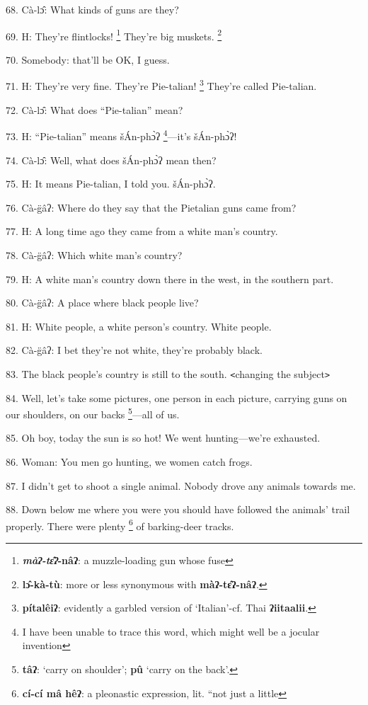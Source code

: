 {68. Cà-lɔ̂: What kinds of guns are they?

69. H: They're flintlocks! \footnote{\textbf{\emph{màʔ-tɛ̂ʔ}}\textbf{-nâʔ}: a muzzle-loading gun whose fuse} They're big muskets. \footnote{\textbf{lɔ̂-kà-tù}: more or less synonymous with \textbf{màʔ-tɛ̂ʔ-nâʔ}.}

70. Somebody: that'll be OK, I guess.

71. H: They're very fine. They're Pie-talian! \footnote{\textbf{pítalêiʔ}: evidently a garbled version of `Italian'-cf. Thai \textbf{ʔiitaalii}.} They're called Pie-talian.

72. Cà-lɔ̂: What does ``Pie-talian'' mean?

73. H: ``Pie-talian'' means šÁn-phɔ̀ʔ \footnote{I have been unable to trace this word, which might well be a jocular invention}---it's šÁn-phɔ̀ʔ!

74. Cà-lɔ̂: Well, what does šÁn-phɔ̀ʔ mean then?

75. H: It means Pie-talian, I told you. šÁn-phɔ̀ʔ.

76. Cà-g̈âʔ: Where do they say that the Pietalian guns came from?

77. H: A long time ago they came from a white man's country.

78. Cà-g̈âʔ: Which white man's country?

79. H: A white man's country down there in the west, in the southern part.

80. Cà-g̈âʔ: A place where black people live?

81. H: White people, a white person's country. White people.

82. Cà-g̈âʔ: I bet they're not white, they're probably black.

83. The black people's country is still to the south. \texttt{<}changing the subject\texttt{>}

84. Well, let's take some pictures, one person in each picture, carrying guns on
our shoulders, on our backs \footnote{\textbf{tâʔ}: `carry on shoulder'; \textbf{pû }`carry on the back'.}---all of us.

85. Oh boy, today the sun is so hot! We went hunting---we're exhausted.

86. Woman: You men go hunting, we women catch frogs.

87. I didn't get to shoot a single animal. Nobody drove any animals towards me.

88. Down below me where you were you should have followed the animals' trail properly.
There were plenty \footnote{\textbf{cí-cí mâ hêʔ}: a pleonastic expression, lit. ``not just a little} of barking-deer tracks.

}
